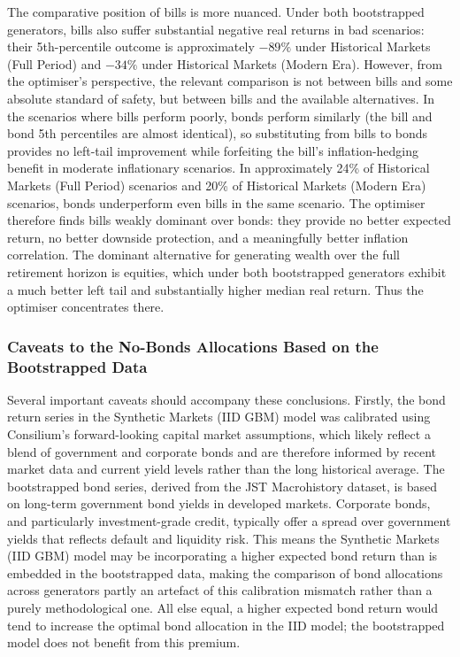 \documentclass[11pt]{article}
\begin{document}
The comparative position of bills is more nuanced. Under both bootstrapped generators, bills also suffer substantial negative real returns in bad scenarios: their 5th-percentile outcome is approximately $-89\%$ under Historical Markets (Full Period) and $-34\%$ under Historical Markets (Modern Era). However, from the optimiser's perspective, the relevant comparison is not between bills and some absolute standard of safety, but between bills and the available alternatives. In the scenarios where bills perform poorly, bonds perform similarly (the bill and bond 5th percentiles are almost identical), so substituting from bills to bonds provides no left-tail improvement while forfeiting the bill's inflation-hedging benefit in moderate inflationary scenarios. In approximately 24\% of Historical Markets (Full Period) scenarios and 20\% of Historical Markets (Modern Era) scenarios, bonds underperform even bills in the same scenario. The optimiser therefore finds bills weakly dominant over bonds: they provide no better expected return, no better downside protection, and a meaningfully better inflation correlation. The dominant alternative for generating wealth over the full retirement horizon is equities, which under both bootstrapped generators exhibit a much better left tail and substantially higher median real return. Thus the optimiser concentrates there.

\subsubsection{Caveats to the No-Bonds Allocations Based on the Bootstrapped Data}

Several important caveats should accompany these conclusions. Firstly, the bond return series in the Synthetic Markets (IID GBM) model was calibrated using Consilium's forward-looking capital market assumptions, which likely reflect a blend of government and corporate bonds and are therefore informed by recent market data and current yield levels rather than the long historical average. The bootstrapped bond series, derived from the JST Macrohistory dataset, is based on long-term government bond yields in developed markets. Corporate bonds, and particularly investment-grade credit, typically offer a spread over government yields that reflects default and liquidity risk. This means the Synthetic Markets (IID GBM) model may be incorporating a higher expected bond return than is embedded in the bootstrapped data, making the comparison of bond allocations across generators partly an artefact of this calibration mismatch rather than a purely methodological one. All else equal, a higher expected bond return would tend to increase the optimal bond allocation in the IID model; the bootstrapped model does not benefit from this premium.
\end{document}
